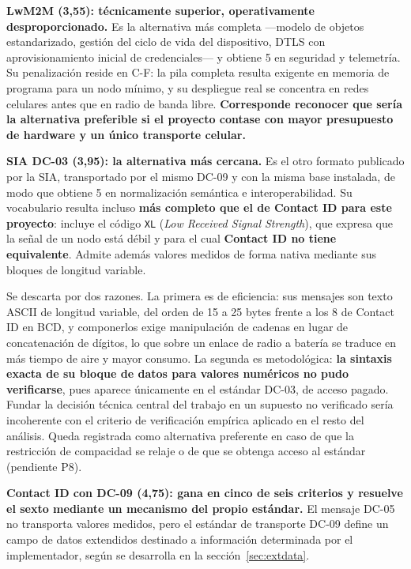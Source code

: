 \textbf{LwM2M (3,55): técnicamente superior, operativamente desproporcionado.} Es la alternativa más
completa ---modelo de objetos estandarizado, gestión del ciclo de vida del dispositivo, DTLS con
aprovisionamiento inicial de credenciales--- y obtiene 5 en seguridad y telemetría. Su penalización
reside en C-F: la pila completa resulta exigente en memoria de programa para un nodo mínimo, y su
despliegue real se concentra en redes celulares antes que en radio de banda libre. \textbf{Corresponde
reconocer que sería la alternativa preferible si el proyecto contase con mayor presupuesto de hardware y
un único transporte celular.}

\textbf{SIA DC-03 (3,95): la alternativa más cercana.} Es el otro formato publicado por la SIA,
transportado por el mismo DC-09 y con la misma base instalada, de modo que obtiene 5 en normalización
semántica e interoperabilidad. Su vocabulario resulta incluso \textbf{más completo que el de Contact ID
para este proyecto}: incluye el código \texttt{XL} (\emph{Low Received Signal Strength}), que expresa
que la señal de un nodo está débil y para el cual \textbf{Contact ID no tiene equivalente}. Admite
además valores medidos de forma nativa mediante sus bloques de longitud variable.

Se descarta por dos razones. La primera es de eficiencia: sus mensajes son texto ASCII de longitud
variable, del orden de 15 a 25 bytes frente a los 8 de Contact ID en BCD, y componerlos exige
manipulación de cadenas en lugar de concatenación de dígitos, lo que sobre un enlace de radio a batería
se traduce en más tiempo de aire y mayor consumo. La segunda es metodológica: \textbf{la sintaxis exacta
de su bloque de datos para valores numéricos no pudo verificarse}, pues aparece únicamente en el
estándar DC-03, de acceso pagado. Fundar la decisión técnica central del trabajo en un supuesto no
verificado sería incoherente con el criterio de verificación empírica aplicado en el resto del análisis.
Queda registrada como alternativa preferente en caso de que la restricción de compacidad se relaje o de
que se obtenga acceso al estándar (pendiente P8).

\textbf{Contact ID con DC-09 (4,75): gana en cinco de seis criterios y resuelve el sexto mediante un
mecanismo del propio estándar.} El mensaje DC-05 no transporta valores medidos, pero el estándar de
transporte DC-09 define un campo de datos extendidos destinado a información determinada por el
implementador, según se desarrolla en la sección~\ref{sec:extdata}.

